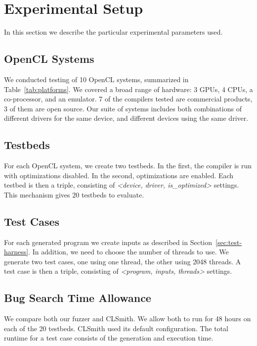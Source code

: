 \section{Experimental Setup}

In this section we describe the particular experimental parameters used.

\subsection{OpenCL Systems}

\begin{table*}[t!]
  \footnotesize %
  \centering %
  
  \caption{%
    OpenCL systems and the number of bug reports submitted to date. For each system, two testbeds are created, one with compiler optimizations, the other without.%
  }
  \label{tab:platforms}
\end{table*}

We conducted testing of 10 OpenCL systems, summarized in Table~\ref{tab:platforms}.  We covered a broad range of hardware: 3 GPUs, 4 CPUs, a co-processor, and an emulator. 7 of the compilers tested are commercial products, 3 of them are open source. Our suite of systems includes both combinations of different drivers for the same device, and different devices using the same driver.

\subsection{Testbeds}
For each OpenCL system, we create two testbeds. In the first, the compiler is run with optimizations disabled. In the second, optimizations are enabled. Each testbed is then a triple, consisting of \emph{<device, driver, is\_optimized>} settings. This mechanism gives 20 testbeds to evaluate.

\subsection{Test Cases}
For each generated program we create inputs as described in Section~\ref{sec:test-harness}. In addition, we need to choose the number of threads to use. We generate two test cases, one using one thread, the other using 2048 threads. A test case is then a triple, consisting of \emph{<program, inputs, threads>} settings.

\subsection{Bug Search Time Allowance}
We compare both our fuzzer and CLSmith. We allow both to run for 48 hours on each of the 20 testbeds.  CLSmith used its default configuration. The total runtime for a test case consists of the generation and execution time.

